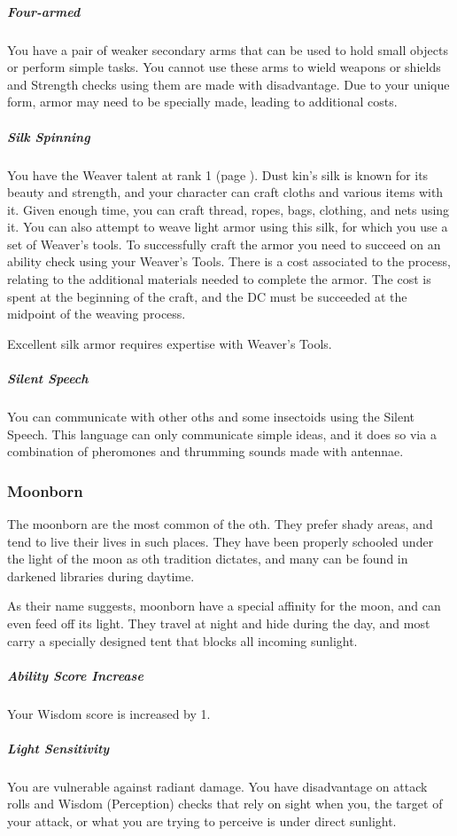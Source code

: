 \begin{linenumbers}
\subparagraph{Four-armed} You have a pair of weaker secondary arms that can be used to hold small objects or perform simple tasks.
You cannot use these arms to wield weapons or shields and Strength checks using them are made with disadvantage.
Due to your unique form, armor may need to be specially made, leading to additional costs.


\subparagraph{Silk Spinning} You have the Weaver talent at rank 1 (page \pageref{tal::weaver}).
Dust kin's silk is known for its beauty and strength, and your character can craft cloths and various items with it.
Given enough time, you can craft thread, ropes, bags, clothing, and nets using it.
You can also attempt to weave light armor using this silk, for which you use a set of Weaver's tools.
To successfully craft the armor you need to succeed on an ability check using your Weaver's Tools.
There is a cost associated to the process, relating to the additional materials needed to complete the armor.
The cost is spent at the beginning of the craft, and the DC must be succeeded at the midpoint of the weaving process.

Excellent silk armor requires expertise with Weaver's Tools.

\subparagraph{Silent Speech} You can communicate with other oths and some insectoids using the Silent Speech.
This language can only communicate simple ideas, and it does so via a combination of pheromones and thrumming sounds made with antennae.

\subsubsection{Moonborn}
The moonborn are the most common of the oth.
They prefer shady areas, and tend to live their lives in such places.
They have been properly schooled under the light of the moon as oth tradition dictates, and many can be found in darkened libraries during daytime.

As their name suggests, moonborn have a special affinity for the moon, and can even feed off its light.
They travel at night and hide during the day, and most carry a specially designed tent that blocks all incoming sunlight.

\subparagraph{Ability Score Increase} Your Wisdom score is increased by 1.

\subparagraph{Light Sensitivity} You are vulnerable against radiant damage.
You have disadvantage on attack rolls and Wisdom (Perception) checks that rely on sight when you, the target of your attack, or what you are trying to perceive is under direct sunlight.


\end{linenumbers}
